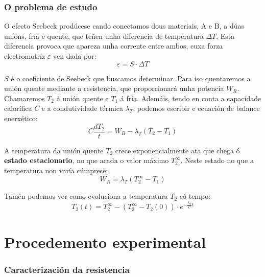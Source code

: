 \documentclass[12pt, a4paper, titlepage]{article}
\begin{document}
  \newpage
  \section{O problema de estudo}

  O efecto Seebeck prodúcese cando conectamos dous materiais, A e B, a dúas unións, fría e quente, que teñen unha diferencia de temperatura $\Delta T$.
  Esta diferencia provoca que apareza unha corrente entre ambos, cuxa forza electromotríz $\varepsilon$ ven dada por:
  \begin{equation}
    \varepsilon = S \cdot \Delta T
    \label{ec:potencial_bornes}
  \end{equation}

  $S$ é o coeficiente de Seebeck que buscamos determinar. Para iso quentaremos a unión quente mediante a resistencia, que proporcionará unha potencia $W_R$.
  Chamaremos $T_2$ á unión quente e $T_1$ á fría. Ademáis, tendo en conta a capacidade calorífica $C$ e a condutividade térmica $\lambda_T$, podemos escribir e ecuación de balance enerxético:
  \begin{equation}
    C \frac{d T_2}{t} = W_R - \lambda_T (T_2 - T_1)
    \label{ec:balance_enerxetico_tempo}
  \end{equation}

  A temperatura da unión quente $T_2$ crece exponencialmente ata que chega ó \textbf{estado estacionario}, no que acada o valor máximo $T_2^\infty$. Neste estado no que a temperatura non varía cúmprese:
  \begin{equation}
    W_R = \lambda_T (T_2^\infty - T_1)
    \label{ec:w_r_lambda_t}
  \end{equation}

  Tamén podemos ver como evoluciona a temperatura $T_2$ có tempo:
  \begin{equation}
    T_2(t) = T_2^\infty - (T_2^\infty - T_2(0)) \cdot e^{-\frac{\lambda_T}{C}t}
    \label{ec:t2_tempo}
  \end{equation}




  \newpage
  \part{Procedemento experimental}

  \section{Caracterización da resistencia}
\end{document}
